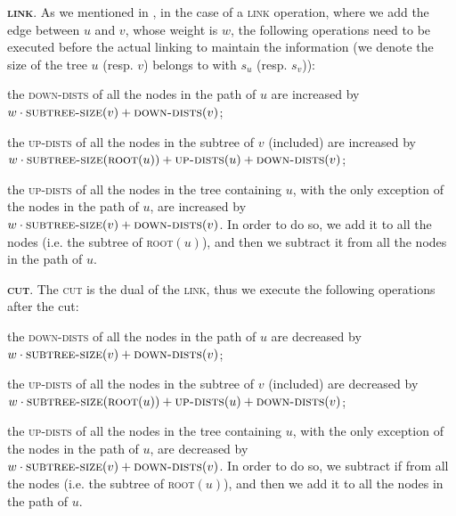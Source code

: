 \documentclass[a4paper,USenglish]{lipics}
\begin{document}
\noindent \textbf{\textsc{link}}. As we mentioned in , in the case of a \textsc{link} operation, where we add the edge between $u$ and $v$, whose weight is $w$, the following operations need to be executed before the actual linking to maintain the information (we denote the size of the tree $u$ (resp. $v$) belongs to with $s_u$ (resp. $s_v$)):
\begin{compactitem}
\item the \textsc{down-dists} of all the nodes in the path of $u$ are increased by $w\cdot\textsc{subtree-size}(v) + \textsc{down-dists}(v)$;
\item the \textsc{up-dists} of all the nodes in the subtree of $v$ (included) are increased by $w\cdot\textsc{subtree-size}(\textsc{root}(u)) + \textsc{up-dists}(u) + \textsc{down-dists}(v)$;
\item the \textsc{up-dists} of all the nodes in the tree containing $u$, with the only exception of the nodes in the path of $u$, are increased by $w\cdot\textsc{subtree-size}(v) + \textsc{down-dists}(v)$. In order to do so, we add it to all the nodes (i.e. the subtree of \textsc{root}$(u)$), and then we subtract it from all the nodes in the path of $u$. 
\end{compactitem}

	
\noindent	\textbf{\textsc{cut}}. The \textsc{cut} is the dual of the \textsc{link}, thus we execute the following operations after the cut:
\begin{compactitem}
\item the \textsc{down-dists} of all the nodes in the path of $u$ are decreased by $w\cdot\textsc{subtree-size}(v) + \textsc{down-dists}(v)$;
\item the \textsc{up-dists} of all the nodes in the subtree of $v$ (included) are decreased by $w\cdot\textsc{subtree-size}(\textsc{root}(u)) + \textsc{up-dists}(u) + \textsc{down-dists}(v)$;
\item the \textsc{up-dists} of all the nodes in the tree containing $u$, with the only exception of the nodes in the path of $u$, are decreased by $w\cdot\textsc{subtree-size}(v) + \textsc{down-dists}(v)$. In order to do so, we subtract if from all the nodes (i.e. the subtree of \textsc{root}$(u)$), and then we add it to all the nodes in the path of $u$. 
\end{compactitem}
		
\end{document}
